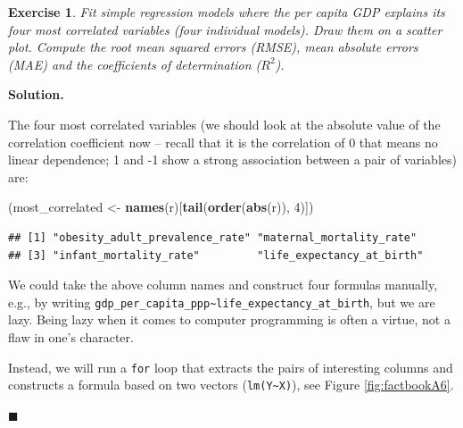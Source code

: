 \documentclass[10pt,b5paper,krantz1]{krantz}
\newenvironment{Shaded}{\begin{snugshade}}{\end{snugshade}}
\newcommand{\DecValTok}[1]{\textcolor[rgb]{0.06,0.06,0.06}{#1}}
\newcommand{\KeywordTok}[1]{\textcolor[rgb]{0.27,0.27,0.27}{\textbf{#1}}}
\newcommand{\NormalTok}[1]{#1}
\newcommand{\StringTok}[1]{\textcolor[rgb]{0.5,0.5,0.5}{#1}}
\newtheorem{exercise}{Exercise}[chapter]
\newenvironment{solution}{%
\bigskip\noindent\textbf{Solution. }%
\it\ignorespaces%
\ignorespaces%
}{\ignorespaces%
\hfill$\blacksquare$%
}
\begin{document}
\begin{exercise}

Fit simple regression models where the per capita GDP explains
its four most correlated variables (four individual models).
Draw them on a scatter plot. Compute the root mean squared errors (RMSE),
mean absolute errors (MAE) and the coefficients of determination (\(R^2\)).

\end{exercise}

\begin{solution}

The four most correlated variables (we should look at the absolute
value of the correlation coefficient now -- recall that it
is the correlation of 0 that means no linear dependence; 1 and -1
show a strong association between a pair of variables) are:

\begin{Shaded}
\begin{Highlighting}[]
\NormalTok{(most_correlated <-}\StringTok{ }\KeywordTok{names}\NormalTok{(r)[}\KeywordTok{tail}\NormalTok{(}\KeywordTok{order}\NormalTok{(}\KeywordTok{abs}\NormalTok{(r)), }\DecValTok{4}\NormalTok{)])}
\end{Highlighting}
\end{Shaded}

\begin{verbatim}
## [1] "obesity_adult_prevalence_rate" "maternal_mortality_rate"      
## [3] "infant_mortality_rate"         "life_expectancy_at_birth"
\end{verbatim}

We could take the above column names and construct four
formulas manually, e.g., by writing
\texttt{gdp\_per\_capita\_ppp\textasciitilde{}life\_expectancy\_at\_birth},
but we are lazy. Being lazy when it comes to computer
programming is often a virtue, not a flaw in one's character.

Instead, we will run a \texttt{for} loop that extracts the pairs of
interesting columns and constructs a formula based on two vectors
(\texttt{lm(Y\textasciitilde{}X)}), see Figure \ref{fig:factbookA6}.


\end{solution}
\end{document}
